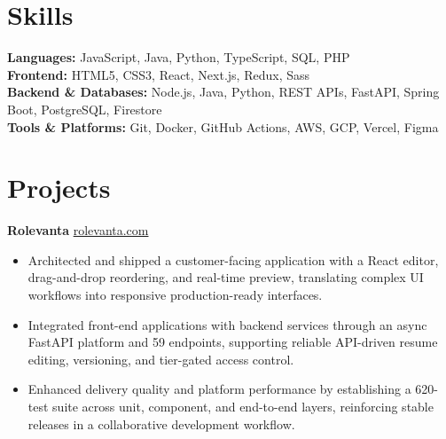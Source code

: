 \documentclass[11pt]{article}       %
\begin{document}
\vspace{-10.5pt}

\section*{Skills}
\textbf{Languages:} JavaScript, Java, Python, TypeScript, SQL, PHP \\
\textbf{Frontend:} HTML5, CSS3, React, Next.js, Redux, Sass \\
\textbf{Backend \& Databases:} Node.js, Java, Python, REST APIs, FastAPI, Spring Boot, PostgreSQL, Firestore \\
\textbf{Tools \& Platforms:} Git, Docker, GitHub Actions, AWS, GCP, Vercel, Figma
\vspace{-5pt}






\section*{Projects}
\textbf{Rolevanta} \hfill \href{https://rolevanta.com}{rolevanta.com} \\
\vspace{-9pt}
\begin{itemize}
  \item Architected and shipped a customer-facing application with a React editor, drag-and-drop reordering, and real-time preview, translating complex UI workflows into responsive production-ready interfaces.
  \item Integrated front-end applications with backend services through an async FastAPI platform and 59 endpoints, supporting reliable API-driven resume editing, versioning, and tier-gated access control.
  \item Enhanced delivery quality and platform performance by establishing a 620-test suite across unit, component, and end-to-end layers, reinforcing stable releases in a collaborative development workflow.
\end{itemize}
\end{document}
